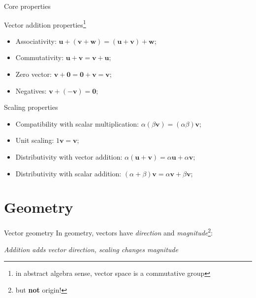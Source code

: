 \documentclass[10pt]{beamer}
\begin{document}
\begin{frame}{Core properties}
    \begin{block}{Vector addition properties\footnote{in abstract algebra sense, vector space is a commutative group}}
    \begin{itemize}
        \item Associativity: $\mathbf u + (\mathbf v + \mathbf w) = (\mathbf u + \mathbf v) + \mathbf w$;
        \item Commutativity: $\mathbf u + \mathbf v = \mathbf v + \mathbf u$;
        \item Zero vector: $\mathbf v + \mathbf 0 = \mathbf 0 + \mathbf v = \mathbf v$;
        \item Negatives: $\mathbf v + (-\mathbf v) = \mathbf 0$;
    \end{itemize}
    \end{block}
    \begin{block}{Scaling properties}
        \begin{itemize}
            \item Compatibility with scalar multiplication: $\alpha (\beta \mathbf v) = (\alpha \beta) \mathbf v$;
            \item Unit scaling: $1 \mathbf v = \mathbf v$;
            \item Distributivity with vector addition: $\alpha (\mathbf u + \mathbf v) = \alpha \mathbf u + \alpha \mathbf v$;
            \item Distributivity with scalar addition: $(\alpha+\beta) \mathbf v = \alpha \mathbf v + \beta \mathbf v$;
        \end{itemize}
    \end{block}
\end{frame}

\section{Geometry}
\begin{frame}{Vector geometry}
    In geometry, vectors have \textit{direction} and \textit{magnitude}\footnote{but \textbf{not} origin!}:

    \begin{center}
        
        
        
        {\small{\textit{Addition adds vector direction, scaling changes magnitude}}}
    \end{center}
\end{frame}
\end{document}
